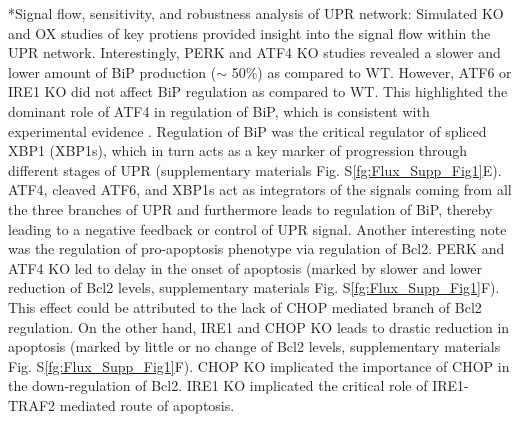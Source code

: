 \documentclass[12pt]{article}
\makeatletter
\renewcommand\subsection{\@startsection
	{subsection}{2}{0mm}
	{-0.05in}
	{-0.5\baselineskip}
	{\normalfont\normalsize\bfseries}}
\makeatother
\begin{document}
\subsection*{Signal flow, sensitivity, and robustness analysis of UPR network:}
Simulated KO and OX studies of key protiens provided insight into the signal flow within the UPR network. Interestingly, PERK and ATF4 KO studies revealed a slower and lower amount of BiP production ($\sim$ 50\%) as compared to WT. However, ATF6 or IRE1 KO did not affect BiP regulation as compared to WT. This highlighted the dominant role of ATF4 in regulation of BiP, which is consistent with experimental evidence \cite{ma2003delineation}. Regulation of BiP was the critical regulator of spliced XBP1 (XBP1s), which in turn acts as a key marker of progression through different stages of UPR (supplementary materials Fig. S\ref{fg:Flux_Supp_Fig1}E). ATF4, cleaved ATF6, and XBP1s act as integrators of the signals coming from all the three branches of UPR and furthermore leads to regulation of BiP, thereby leading to a negative feedback or control of UPR signal. Another interesting note was the regulation of pro-apoptosis phenotype via regulation of Bcl2. PERK and ATF4 KO led to delay in the onset of apoptosis (marked by slower and lower reduction of Bcl2 levels, supplementary materials Fig. S\ref{fg:Flux_Supp_Fig1}F). This effect could be attributed to the lack of CHOP mediated branch of Bcl2 regulation. On the other hand, IRE1 and CHOP KO leads to drastic reduction in apoptosis (marked by little or no change of Bcl2 levels, supplementary materials Fig. S\ref{fg:Flux_Supp_Fig1}F). CHOP KO implicated the importance of CHOP in the down-regulation of Bcl2. IRE1 KO implicated the critical role of IRE1-TRAF2 mediated route of apoptosis. 
\end{document}
